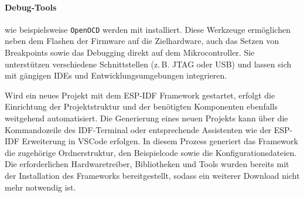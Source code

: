 \paragraph{Debug-Tools}
wie beispielsweise \texttt{OpenOCD} werden mit installiert.
Diese Werkzeuge ermöglichen neben dem Flashen der Firmware auf die Zielhardware, auch das Setzen von Breakpoints sowie das Debugging direkt auf dem Mikrocontroller. 
Sie unterstützen verschiedene Schnittstellen (z.\,B. JTAG oder USB) und lassen sich mit gängigen IDEs und Entwicklungsumgebungen integrieren.


Wird ein neues Projekt mit dem ESP-IDF Framework gestartet, erfolgt die Einrichtung der Projektstruktur und der benötigten Komponenten ebenfalls weitgehend automatisiert.
Die Generierung eines neuen Projekts kann über die Kommandozeile des IDF-Terminal oder entsprechende Assistenten wie der ESP-IDF Erweiterung in VSCode erfolgen.
In diesem Prozess generiert das Framework die zugehörige Ordnerstruktur, den Beispielcode sowie die Konfigurationsdateien.
Die erforderlichen Hardwaretreiber, Bibliotheken und Tools wurden bereits mit der Installation des Frameworks bereitgestellt, sodass ein weiterer Download nicht mehr notwendig ist.












































